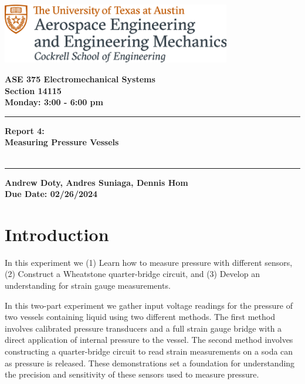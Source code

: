 \documentclass{article}
\begin{document}
\begin{titlepage}
  \centering
  \includegraphics[width=10cm]{ase-logo-formal.png}  %
  \vspace{1cm}  %
 
  \Large \textbf{ASE 375 Electromechanical Systems}\\
  \large \textbf{Section 14115}\\
  \vspace{0.5cm}
  \textbf{Monday: 3:00 - 6:00 pm}\\
 
  \vspace{1cm}
 
  \hrule
  \vspace{0.5cm}
 
  \Huge \textbf{Report 4:\\
  Measuring Pressure Vessels}\\
  \Huge \textbf{}\\
 
  \vspace{0.5cm}
  \hrule
 
  \vspace{1cm}
 
  \normalsize \textbf{Andrew Doty, Andres Suniaga, Dennis Hom}\\
  \normalsize \textbf{Due Date: 02/26/2024}
 
\end{titlepage}
\newpage

\tableofcontents
\thispagestyle{empty}
\newpage

\section{Introduction}
In this experiment we (1) Learn how to measure pressure with different sensors, (2) Construct a Wheatstone quarter-bridge circuit, and (3) Develop an understanding for strain gauge measurements. 

In this two-part experiment we gather input voltage readings for the pressure of two vessels containing liquid using two different methods. The first method involves calibrated pressure transducers and a full strain gauge bridge with a direct application of internal pressure to the vessel. The second method involves constructing a quarter-bridge circuit to read strain measurements on a soda can as pressure is released. These demonstrations set a foundation for understanding the precision and sensitivity of these sensors used to measure pressure. 
\end{document}
